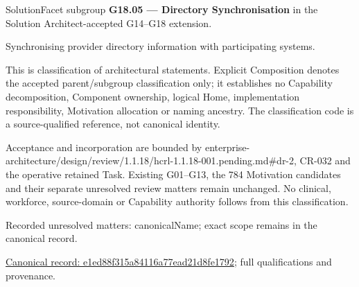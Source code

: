 SolutionFacet subgroup \textbf{G18.05 — Directory Synchronisation} in the Solution Architect-accepted G14–G18 extension.



Synchronising provider directory information with participating systems.



This is classification of architectural statements. Explicit Composition denotes the accepted parent/subgroup classification only; it establishes no Capability decomposition, Component ownership, logical Home, implementation responsibility, Motivation allocation or naming ancestry. The classification code is a source-qualified reference, not canonical identity.



Acceptance and incorporation are bounded by enterprise-architecture/design/review/1.1.18/hcrl-1.1.18-001.pending.md\#dr-2, CR-032 and the operative retained Task. Existing G01–G13, the 784 Motivation candidates and their separate unresolved review matters remain unchanged. No clinical, workforce, source-domain or Capability authority follows from this classification.


{\small Recorded unresolved matters: canonicalName; exact scope remains in the canonical record.}\par
{\footnotesize \href{../../../../../../../continuum/grouping/e1ed88f315a84116a77ead21d8fe1792.md}{Canonical record: e1ed88f315a84116a77ead21d8fe1792}; full qualifications and provenance.}\par
